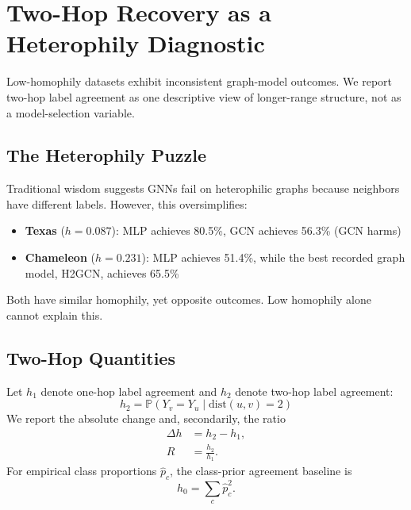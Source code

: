 
\section{Two-Hop Recovery as a Heterophily Diagnostic}
\label{sec:heterophily}

Low-homophily datasets exhibit inconsistent graph-model outcomes. We report two-hop label agreement as one descriptive view of longer-range structure, not as a model-selection variable.

\subsection{The Heterophily Puzzle}

Traditional wisdom suggests GNNs fail on heterophilic graphs because neighbors have different labels. However, this oversimplifies:

\begin{itemize}
    \item \textbf{Texas} ($h = 0.087$): MLP achieves 80.5\%, GCN achieves 56.3\% (GCN harms)
    \item \textbf{Chameleon} ($h = 0.231$): MLP achieves 51.4\%, while the best recorded graph model, H2GCN, achieves 65.5\%
\end{itemize}

Both have similar homophily, yet opposite outcomes. Low homophily alone cannot explain this.

\subsection{Two-Hop Quantities}

\begin{definition}
\label{def:2hop}
Let $h_1$ denote one-hop label agreement and $h_2$ denote two-hop label agreement:
\begin{equation}
    h_2 = \mathbb{P}(Y_v = Y_u \mid \text{dist}(u, v) = 2)
\end{equation}
We report the absolute change and, secondarily, the ratio
\begin{align}
    \Delta h &= h_2-h_1, \\
    R &= \frac{h_2}{h_1}.
\end{align}
For empirical class proportions $\widehat p_c$, the class-prior agreement baseline is
\begin{equation}
    h_0=\sum_c \widehat p_c^2.
\end{equation}
\end{definition}

